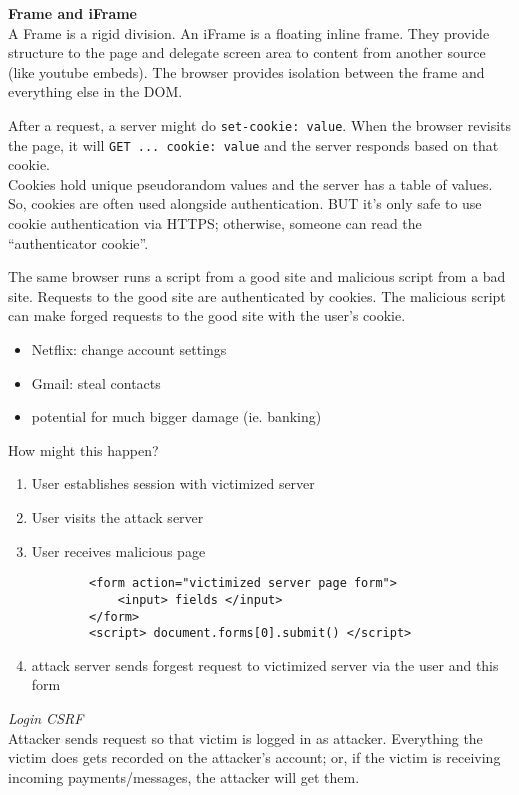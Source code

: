 \textbf{Frame and iFrame}\\
A Frame is a rigid division. An iFrame is a floating inline frame. They provide structure to the page and delegate screen area to content from another source (like youtube embeds). The browser provides isolation between the frame and everything else in the DOM.

After a request, a server might do \texttt{set-cookie: value}. When the browser revisits the page, it will \texttt{GET ... cookie: value} and the server responds based on that cookie.\\

Cookies hold unique pseudorandom values and the server has a table of values. So, cookies are often used alongside authentication. BUT it's only safe to use cookie authentication via HTTPS; otherwise, someone can read the ``authenticator cookie''.

The same browser runs a script from a good site and malicious script from a bad site. Requests to the good site are authenticated by cookies. The malicious script can make forged requests to the good site with the user's cookie.
\begin{itemize}
	\item Netflix: change account settings
	\item Gmail: steal contacts
	\item potential for much bigger damage (ie. banking)
\end{itemize}

How might this happen?
\begin{enumerate}
	\item User establishes session with victimized server
	\item User visits the attack server
	\item User receives malicious page
		\begin{verbatim}
		<form action="victimized server page form">
		    <input> fields </input>
		</form>
		<script> document.forms[0].submit() </script>
		\end{verbatim}
	\item attack server sends forgest request to victimized server via the user and this form
\end{enumerate}

\textit{Login CSRF}\\
Attacker sends request so that victim is logged in as attacker. Everything the victim does gets recorded on the attacker's account; or, if the victim is receiving incoming payments/messages, the attacker will get them.


